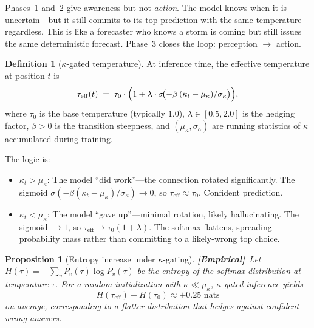 \documentclass[11pt,a4paper]{article}
\newtheorem{proposition}[theorem]{Proposition}
\theoremstyle{definition}
\newtheorem{definition}[theorem]{Definition}
\theoremstyle{remark}
\newcommand{\statusempirical}{\textcolor{purple!70!black}{\textbf{[Empirical]}}}
\begin{document}
Phases~1 and~2 give awareness but not \emph{action}. The model 
knows when it is uncertain---but it still commits to its top 
prediction with the same temperature regardless. This is like 
a forecaster who knows a storm is coming but still issues the 
same deterministic forecast. Phase~3 closes the loop: perception 
$\to$ action.

\begin{definition}[$\kappa$-gated temperature]\label{def:kappa_gated}
At inference time, the effective temperature at position $t$ is
\begin{equation}\label{eq:kappa_gated_temp}
    \tau_{\mathrm{eff}}(t) \;=\; \tau_0 \cdot 
    \Bigl(1 + \lambda \cdot 
    \sigma\!\bigl(-\beta\,(\kappa_t - \mu_\kappa)/
    \sigma_\kappa\bigr)\Bigr),
\end{equation}
where $\tau_0$ is the base temperature (typically $1.0$), 
$\lambda \in [0.5, 2.0]$ is the hedging factor, $\beta > 0$ is 
the transition steepness, and $(\mu_\kappa, \sigma_\kappa)$ are 
running statistics of $\kappa$ accumulated during training.
\end{definition}

The logic is:
\begin{itemize}[nosep]
    \item $\kappa_t > \mu_\kappa$: The model ``did work''---the 
    connection rotated significantly. The sigmoid 
    $\sigma(-\beta(\kappa_t - \mu_\kappa)/\sigma_\kappa) \to 0$, 
    so $\tau_{\mathrm{eff}} \approx \tau_0$. Confident prediction.
    
    \item $\kappa_t < \mu_\kappa$: The model ``gave up''---minimal 
    rotation, likely hallucinating. The sigmoid $\to 1$, so 
    $\tau_{\mathrm{eff}} \to \tau_0(1 + \lambda)$. The softmax 
    flattens, spreading probability mass rather than committing 
    to a likely-wrong top choice.
\end{itemize}

\begin{proposition}[Entropy increase under $\kappa$-gating]
\label{prop:entropy_gating}
\statusempirical\ Let $H(\tau) = -\sum_v P_v(\tau) \log P_v(\tau)$ 
be the entropy of the softmax distribution at temperature $\tau$. 
For a random initialization with $\kappa \ll \mu_\kappa$, 
$\kappa$-gated inference yields
\[
    H(\tau_{\mathrm{eff}}) - H(\tau_0) \approx +0.25 \text{ nats}
\]
on average, corresponding to a flatter distribution that hedges 
against confident wrong answers.
\end{proposition}
\end{document}
